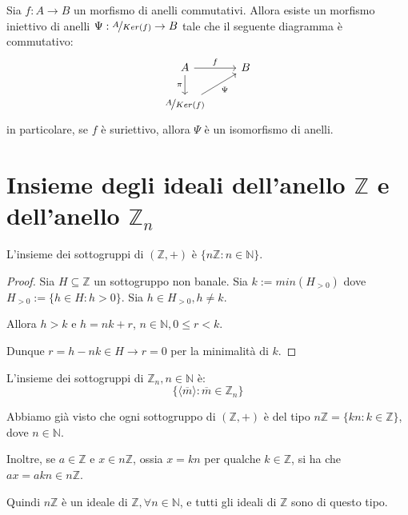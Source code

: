 \documentclass[10pt,a4paper,twoside]{book}
\begin{document}
\begin{theorem}
    Sia $f : A \rightarrow B$ un morfismo di anelli commutativi. Allora esiste un morfismo iniettivo di anelli $\Psi : \nicefrac{A}{Ker(f)} \rightarrow B$ tale che il seguente diagramma è commutativo:
    \begin{equation*}
        \begin{tikzcd}
            A \arrow{r}{f} \arrow[swap]{d}{\pi} & B \\
            \nicefrac{A}{Ker(f)} \arrow[swap]{ur}{\Psi}
        \end{tikzcd}
    \end{equation*}
    in particolare, se $f$ è suriettivo, allora $\Psi$ è un isomorfismo di anelli.
\end{theorem}
\newpage

\section{Insieme degli ideali dell’anello \( \mathbb{Z} \) e dell'anello \( \mathbb{Z}_n \)}

\begin{proposition}
    L'insieme dei sottogruppi di $(\mathbb{Z} ,+)$ è $\{n \mathbb{Z} : n \in \mathbb{N} \} $.
\end{proposition}

\begin{proof}
    Sia $H \subseteq \mathbb{Z} $ un sottogruppo non banale. Sia $k := min (H_{>0})$ dove $H_{>0} := \{h \in H : h > 0\}$. Sia $h \in H_{>0}, h \neq k$.

    Allora $h > k$ e $h = nk + r$, $n \in \mathbb{N} , 0 \leq r <k$.

    Dunque $r = h - nk \in H \rightarrow r =0$ per la minimalità di $k$.
\end{proof}

\begin{corollary}
    L'insieme dei sottogruppi di $\mathbb{Z}_n , n \in \mathbb{N} $ è:
    \begin{equation*}
        \{\langle \overline{m} \rangle : \overline{m} \in \mathbb{Z}_n \}
    \end{equation*}
\end{corollary}

\begin{example}
    Abbiamo già visto che ogni sottogruppo di $(\mathbb{Z} , +)$ è del tipo $n \mathbb{Z} = \{kn : k \in \mathbb{Z} \}$, dove $n \in \mathbb{N}$.

    Inoltre, se $a \in \mathbb{Z} $ e $x \in n\mathbb{Z} $, ossia $x=kn$ per qualche $k \in \mathbb{Z} $, si ha che $ax=akn \in n \mathbb{Z} $.

    Quindi $n \mathbb{Z} $ è un ideale di $\mathbb{Z}, \forall n \in \mathbb{N}  $, e tutti gli ideali di $\mathbb{Z} $ sono di questo tipo.
\end{example}
\end{document}

